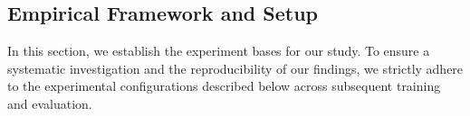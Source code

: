 \documentclass[11pt]{article}
\begin{document}



\subsection{Empirical Framework and Setup}
In this section, we establish the experiment bases for our study. 
To ensure a systematic investigation and the reproducibility of our findings, we strictly adhere to the experimental configurations described below across subsequent training and evaluation.
\end{document}

